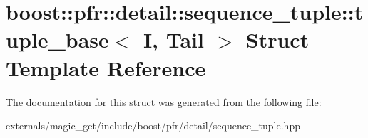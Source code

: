 \hypertarget{structboost_1_1pfr_1_1detail_1_1sequence__tuple_1_1tuple__base}{}\section{boost\+:\+:pfr\+:\+:detail\+:\+:sequence\+\_\+tuple\+:\+:tuple\+\_\+base$<$ I, Tail $>$ Struct Template Reference}
\label{structboost_1_1pfr_1_1detail_1_1sequence__tuple_1_1tuple__base}


The documentation for this struct was generated from the following file\+:\begin{DoxyCompactItemize}
\item 
externals/magic\+\_\+get/include/boost/pfr/detail/sequence\+\_\+tuple.\+hpp\end{DoxyCompactItemize}
